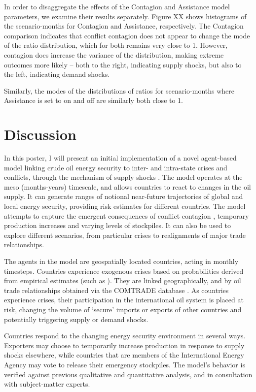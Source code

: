 \documentclass{article}
\begin{document}
In order to disaggregate the effects of the Contagion and Assistance model parameters, we examine their results separately. Figure XX shows histograms of the scenario-months for Contagion and Assistance, respectively. The Contagion comparison indicates that conflict contagion does not appear to change the mode of the ratio distribution, which for both remains very close to 1. However, contagion does increase the variance of the distribution, making extreme outcomes more likely -- both to the right, indicating supply shocks, but also to the left, indicating demand shocks. 

Similarly, the modes of the distributions of ratios for scenario-months where Assistance is set to on and off are similarly both close to 1. 

\section{Discussion}



In this poster, I will present an initial implementation of a novel agent-based model linking crude oil energy security to inter- and intra-state crises and conflicts, through the mechanism of supply shocks \citep{kilian_2008}. The model operates at the meso (months-years) timescale, and allows countries to react to changes in the oil supply. It can generate ranges of notional near-future trajectories of global and local energy security, providing risk estimates for different countries. The model attempts to capture the emergent consequences of conflict contagion \citep{black_2013}, temporary production increases and varying levels of stockpiles. It can also be used to explore different scenarios, from particular crises to realignments of major trade relationships. 

The agents in the model are geospatially located countries, acting in monthly timesteps. Countries experience exogenous crises based on probabilities derived from empirical estimates (such as \citep{goldstone_2005,eiu_2013,ward_2013}). They are linked geographically, and by oil trade relationships obtained via the COMTRADE database \citep{un_2013}. As countries experience crises, their participation in the  international oil system is placed at risk, changing the volume of `secure' imports or exports of other countries and  potentially triggering supply or demand shocks. 

Countries respond to the changing energy security environment in several ways. Exporters may choose to temporarily increase production in response to supply shocks elsewhere, while countries that are members of the International Energy Agency may vote to release their emergency stockpiles. The model's behavior is verified against previous qualitative and quantitative analysis, and in consultation with subject-matter experts. 
\end{document}
